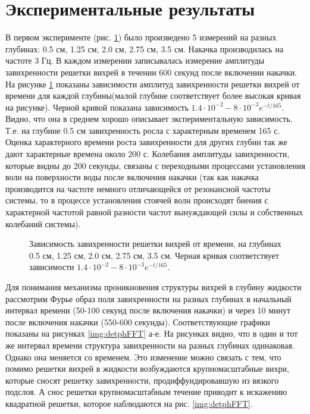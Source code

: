 \section{Экспериментальные результаты} \label{sect6_3}

В первом эксперименте (рис. \ref{img:5deeps}) было произведено 5 измерений на разных глубинах: 0.5 см, 1.25 см, 2.0 см, 2.75 см, 3.5 см. Накачка производилась на частоте 3 Гц. В каждом измерении записывалась измерение амплитуды завихренности решетки вихрей в течении 600 секунд после включении накачки. На рисунке \ref{img:5deeps} показаны зависимости амплитуд завихренности решетки вихрей от времени для каждой глубины(малой глубине соответствует более высокая кривая на рисунке). Черной кривой показана зависимость $1.4 \cdot 10^{-2} - 8 \cdot 10^{-3} e^{-t/165}$. Видно, что она в среднем хорошо описывает экспериментальную зависимость. Т.е. на глубине 0.5 см завихренность росла с характерным временем 165 с. Оценка характерного времени роста завихренности для других глубин так же дают характерные времена около 200 с. Колебания амплитуды завихренности, которые видны до 200 секунды, связаны с переходными процессами установления волн на поверхности воды после включения накачки (так как накачка производится на частоте немного отличающейся от резонансной частоты системы, то в процессе установления стоячей волн происходят биения с характерной частотой равной разности частот вынуждающей силы и собственных колебаний системы).

\begin{figure}[ht]
 \caption{Зависимость завихренности решетки вихрей от времени, на глубинах 0.5 см, 1.25 см, 2.0 см, 2.75 см, 3.5 см. Черная кривая соответствует зависимости $1.4 \cdot 10^{-2} - 8 \cdot 10^{-3} e^{-t/165}$.}
 \label{img:5deeps} 
\end{figure}

Для понимания механизма проникновения структуры вихрей в глубину жидкости рассмотрим Фурье образ поля завихренности на разных глубинах в начальный интервал времени (50-100 секунд после включения накачки) и через 10 минут после включения накачки (550-600 секунды). Соответствующие графики показаны на рисунках \ref{img:detphFFT} а-е. На рисунках видно, что в один и тот же интервал времени структура завихренности на разных глубинах одинаковая. Однако она меняется со временем. Это изменение можно связать с тем, что помимо решетки вихрей в жидкости возбуждаются крупномасштабные вихри, которые сносят решетку завихренности, продиффундировавшую из вязкого подслоя. А снос решетки крупномасштабным течение приводит к искажению квадратной решетки, которое наблюдаются на рис. \ref{img:detphFFT}.

